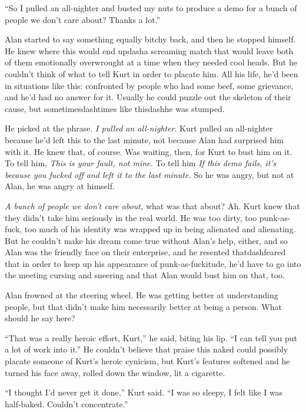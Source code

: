 ``So I pulled an all-nighter and busted my nuts to produce a demo for
a bunch of people we don't care about?  Thanks a lot.''

Alan started to say something equally bitchy back, and then he stopped
himself.  He knew where this would end updash{}a screaming match that
would leave both of them emotionally overwrought at a time when they
needed cool heads.  But he couldn't think of what to tell Kurt in
order to placate him.  All his life, he'd been in situations like
this:  confronted by people who had some beef, some grievance, and
he'd had no answer for it.  Usually he could puzzle out the skeleton
of their cause, but sometimesdash{}times like thisdash{}he was stumped.

He picked at the phrase.  \textit{I pulled an all-nighter}.  Kurt
pulled an all-nighter because he'd left this to the last minute, not
because Alan had surprised him with it.  He knew that, of course.  Was
waiting, then, for Kurt to bust him on it.  To tell him, \textit{This
is your fault, not mine.} To tell him \textit{If this demo fails, it's
because you fucked off and left it to the last minute.} So he was
angry, but not at Alan, he was angry at himself.

\textit{A bunch of people we don't care about,} what was that about? 
Ah.  Kurt knew that they didn't take him seriously in the real world. 
He was too dirty, too punk-as-fuck, too much of his identity was
wrapped up in being alienated and alienating.  But he couldn't make
his dream come true without Alan's help, either, and so Alan was the
friendly face on their enterprise, and he resented thatdash{}feared that
in order to keep up his appearance of punk-as-fuckitude, he'd have to
go into the meeting cursing and sneering and that Alan would bust him
on that, too.

Alan frowned at the steering wheel.  He was getting better at
understanding people, but that didn't make him necessarily better at
being a person.  What should he say here?

``That was a really heroic effort, Kurt,'' he said, biting his lip. 
``I can tell you put a lot of work into it.'' He couldn't believe that
praise this naked could possibly placate someone of Kurt's heroic
cynicism, but Kurt's features softened and he turned his face away,
rolled down the window, lit a cigarette.

``I thought I'd never get it done,'' Kurt said.  ``I was so sleepy, I
felt like I was half-baked.  Couldn't concentrate.''

